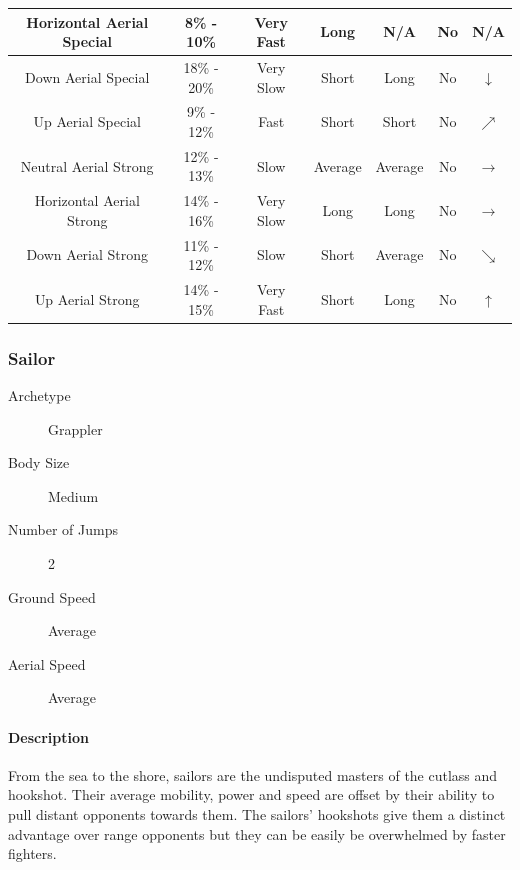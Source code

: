 \begin{table}[h!]
\begin{tabular}{| c | c | c | c | c | c | c |}
        \hline
        Horizontal Aerial Special & 8\% - 10\% & Very Fast & Long & N/A & No & N/A \\
        \hline
        Down Aerial Special & 18\% - 20\% & Very Slow & Short & Long & No & $\downarrow$ \\
        \hline
        Up Aerial Special & 9\% - 12\% & Fast & Short & Short & No & $\nearrow$ \\
        \hline
        Neutral Aerial Strong & 12\% - 13\% & Slow & Average & Average & No & $\rightarrow$ \\
        \hline
        Horizontal Aerial Strong & 14\% - 16\% & Very Slow & Long & Long & No & $\rightarrow$ \\
        \hline
        Down Aerial Strong & 11\% - 12\% & Slow & Short & Average & No & $\searrow$ \\
        \hline
        Up Aerial Strong & 14\% - 15\% & Very Fast & Short & Long & No & $\uparrow$ \\
        \hline
    \end{tabular}
\end{table}

\pagebreak

\subsubsection{Sailor}

\begin{description}
    \item[Archetype] Grappler
    \item[Body Size] Medium
    \item[Number of Jumps] 2
    \item[Ground Speed] Average
    \item[Aerial Speed] Average 
\end{description}

\paragraph{Description} From the sea to the shore, sailors are the undisputed masters of the cutlass and hookshot. Their average mobility, power and speed are offset by their ability to pull distant opponents towards them. The sailors' hookshots give them a distinct advantage over range opponents but they can be easily be overwhelmed by faster fighters.

